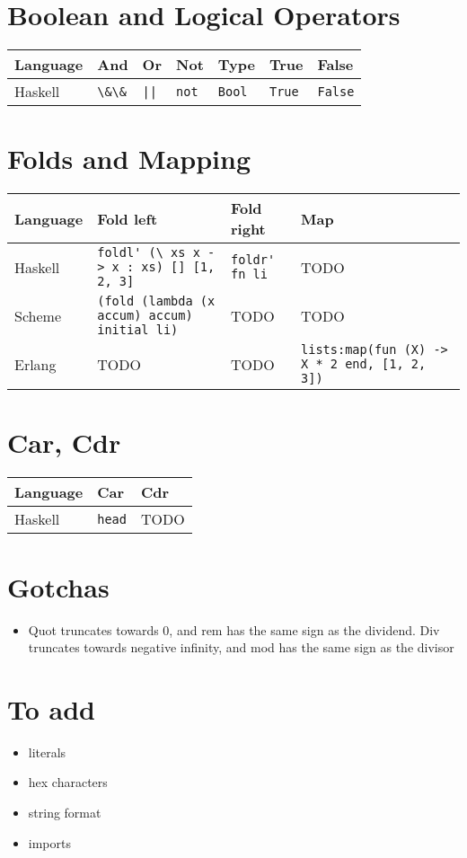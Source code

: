 \documentclass{article}
\begin{document}
\section{Boolean and Logical Operators}
\begin{longtabu} to 0.75\linewidth{ X X X  X X X X }
	Language & And & Or & Not & Type & True & False \\
	\hline
	Haskell & \lstinline$\&\&$ & \lstinline$||$ & \lstinline$not$ & \lstinline$Bool$ & \lstinline$True$ & \lstinline$False$ \\
\end{longtabu}

\section{Folds and Mapping}
\begin{longtabu} to 0.75\linewidth { X X X X }
	Language & Fold left & Fold right & Map\\
	\hline
	Haskell & \lstinline$foldl' (\ xs x -> x : xs) [] [1, 2, 3]$ & \lstinline$foldr' fn li$ & TODO \\
	Scheme & \lstinline$(fold (lambda (x accum) accum) initial li)$ & TODO & TODO \\
	Erlang & TODO & TODO & \lstinline$lists:map(fun (X) -> X * 2 end, [1, 2, 3])$ \\
\end{longtabu}

\section{Car, Cdr}
\begin{longtabu} to 0.64\linewidth { X X X }
	Language & Car & Cdr \\
	\hline
	Haskell & \lstinline$head$ & TODO \\
\end{longtabu}

\section{Gotchas}
\begin{itemize}
	\item Quot truncates towards 0, and rem has the same sign as the dividend. Div truncates towards negative infinity, and mod has the same sign as the divisor
\end{itemize}

\section{To add}
\begin{itemize}
	\item literals
	\item hex characters
	\item string format
	\item imports
\end{itemize}
\end{document}
